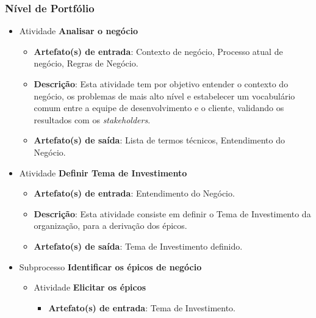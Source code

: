 
  \subsubsection{Nível de Portfólio}
    
    \begin{itemize}
      
      \item Atividade \textbf{Analisar o negócio}
	  
	  \begin{itemize}
	    \item \textbf{Artefato(s) de entrada}: Contexto de negócio, Processo atual de negócio, Regras de Negócio.
	    
	    \item \textbf{Descrição}: Esta atividade tem por objetivo entender o contexto do negócio, os problemas de mais alto nível
	      e estabelecer um vocabulário comum entre a equipe de desenvolvimento e o cliente, validando os resultados com os
	      \textit{stakeholders}.
	    
	    \item \textbf{Artefato(s) de saída}: Lista de termos técnicos, Entendimento do Negócio.
	      
	  \end{itemize}
     
     \item Atividade \textbf{Definir Tema de Investimento}
	
	\begin{itemize}
	  \item \textbf{Artefato(s) de entrada}: Entendimento do Negócio.
	  
	  \item \textbf{Descrição}: Esta atividade consiste em definir o Tema de Investimento da organização,
	    para a derivação dos épicos.
	  
	  \item \textbf{Artefato(s) de saída}: Tema de Investimento definido.
	 	 
	\end{itemize}
	
     \item Subprocesso \textbf{Identificar os épicos de negócio}
	
	\begin{itemize}
	  
	  \item Atividade \textbf{Elicitar os épicos}
	  
	      \begin{itemize}
		\item \textbf{Artefato(s) de entrada}: Tema de Investimento.
		

\end{itemize}
\end{itemize}
\end{itemize}
